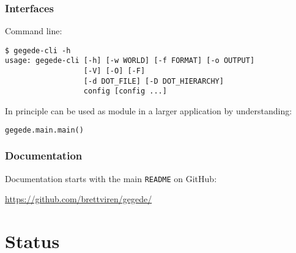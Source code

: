 \documentclass[10pt,xcolor=dvipsnames]{beamer}
\begin{document}
\begin{frame}[fragile]
  \frametitle{Interfaces}
  Command line:
\begin{verbatim}
$ gegede-cli -h
usage: gegede-cli [-h] [-w WORLD] [-f FORMAT] [-o OUTPUT] 
                  [-V] [-O] [-F]
                  [-d DOT_FILE] [-D DOT_HIERARCHY]
                  config [config ...]
\end{verbatim}

  \vfill

  In principle can be used as module in a larger application by understanding: 
  \begin{lstlisting}[language=Python]
    gegede.main.main()
  \end{lstlisting}
  
\end{frame}

\begin{frame}
  \frametitle{Documentation}

  \begin{center}
    Documentation starts with the main \texttt{README} on GitHub:

    \vspace{1cm}

    \url{https://github.com/brettviren/gegede/}    
  \end{center}

\end{frame}

\section{Status}

\begin{frame}
\end{frame}
\end{document}
